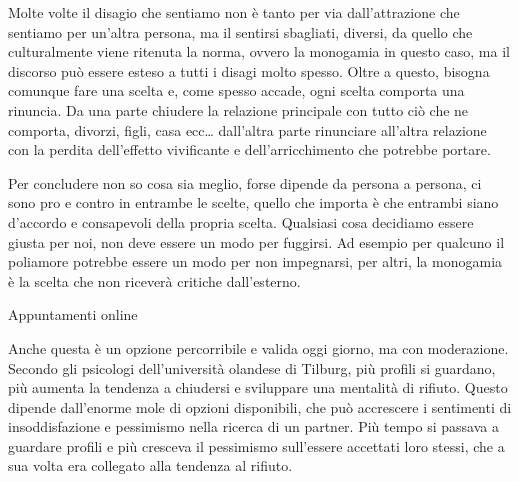 \documentclass[12pt]{book} %
\begin{document}
Molte volte il disagio che sentiamo non è tanto per via dall'attrazione che sentiamo per
un'altra persona, ma il sentirsi sbagliati, diversi, da quello che culturalmente viene ritenuta la
norma, ovvero la monogamia in questo caso, ma il discorso può essere esteso a tutti i disagi molto spesso. Oltre a
questo, bisogna comunque fare una scelta e, come spesso accade, ogni scelta comporta una rinuncia. Da una parte
chiudere la relazione principale con tutto ciò che ne comporta, divorzi, figli, casa ecc…
dall'altra parte rinunciare all'altra relazione con la perdita
dell'effetto vivificante e dell'arricchimento che potrebbe portare. 

Per concludere non so cosa sia meglio, forse dipende da persona a persona, ci sono pro e contro in entrambe le scelte,
quello che importa è che entrambi siano d'accordo e consapevoli della propria scelta. Qualsiasi
cosa decidiamo essere giusta per noi, non deve essere un modo per fuggirsi. Ad esempio per qualcuno il poliamore
potrebbe essere un modo per non impegnarsi, per altri, la monogamia è la scelta che non riceverà critiche dall'esterno.

\begin{mdframed}[linewidth=1pt]
Appuntamenti online

Anche questa è un opzione percorribile e valida oggi giorno, ma con moderazione. Secondo gli psicologi dell'università
olandese di Tilburg, più profili si guardano, più aumenta la tendenza a chiudersi e sviluppare una mentalità di
rifiuto. Questo dipende dall'enorme mole di opzioni disponibili, che può accrescere i sentimenti
di insoddisfazione e pessimismo nella ricerca di un partner. Più tempo si passava a guardare profili e più cresceva il
pessimismo sull'essere accettati loro stessi, che a sua volta era collegato alla tendenza al rifiuto.
\end{mdframed}
\end{document}
